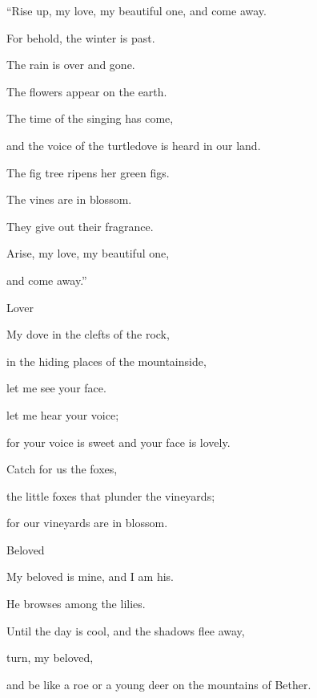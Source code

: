 {\par }{\QB “Rise up, my love, my beautiful one, and come away.
\par }{\Q {}For behold, the winter is past.
\par }{\QB The rain is over and gone.
\par }{\Q {}The flowers appear on the earth.
\par }{\QB The time of the singing has come,
\par }{\QB and the voice of the turtledove is heard in our land.
\par }{\Q {}The fig tree ripens her green figs.
\par }{\QB The vines are in blossom.
\par }{\QB They give out their fragrance.
\par }{\Q Arise, my love, my beautiful one,
\par }{\QB and come away.”
\par }{\SP Lover
\par }{\Q {}My dove in the clefts of the rock,
\par }{\QB in the hiding places of the mountainside,
\par }{\QB let me see your face.
\par }{\QB let me hear your voice;
\par }{\QB for your voice is sweet and your face is lovely.
\par }{\Q {}Catch for us the foxes,
\par }{\QB the little foxes that plunder the vineyards;
\par }{\QB for our vineyards are in blossom.
\par }{\SP Beloved
\par }{\Q {}My beloved is mine, and I am his.
\par }{\QB He browses among the lilies.
\par }{\Q {}Until the day is cool, and the shadows flee away,
\par }{\QB turn, my beloved,
\par }{\QB and be like a roe or a young deer on the mountains of Bether.

}
